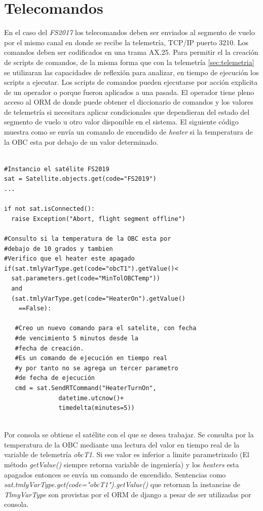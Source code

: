 \documentclass[twoside,twocolumn]{article}
\begin{document}
\section{Telecomandos}
\label{sec:telecomandos}

En el caso del \textit{FS2017} los telecomandos deben ser enviados al segmento de vuelo por el mismo canal en donde se recibe la telemetría, TCP/IP puerto 3210. Los comandos deben ser codificados en una trama AX.25. 
Para permitir el la creación de scripts de comandos, de la misma forma que con 
la telemetría \ref{sec:telemetria} se utilizaran las capacidades de reflexión 
para analizar, en tiempo de ejecución los scripts a ejecutar. Los scripts de 
comandos pueden ejecutarse por acción explicita de un operador o porque fueron 
aplicados a una pasada. 
El operador tiene pleno acceso al ORM de donde puede obtener el diccionario de comandos y los valores de telemetría si necesitara aplicar condicionales que dependieran del estado del segmento de vuelo u otro valor disponible en el sistema. El siguiente código muestra como se envía un comando de encendido de \textit{heater} si la temperatura de la OBC esta por debajo de un valor determinado.

\begin{verbatim}

#Instancio el satélite FS2019
sat = Satellite.objects.get(code="FS2019")
...

if not sat.isConnected():
  raise Exception("Abort, flight segment offline")

#Consulto si la temperatura de la OBC esta por 
#debajo de 10 grados y tambien
#Verifico que el heater este apagado
if(sat.tmlyVarType.get(code="obcT1").getValue()<
  sat.parameters.get(code="MinTolOBCTemp"))
  and 
  (sat.tmlyVarType.get(code="HeaterOn").getValue()
    ==False):
   
   #Creo un nuevo comando para el satelite, con fecha 
   #de vencimiento 5 minutos desde la 
   #fecha de creación. 
   #Es un comando de ejecución en tiempo real 
   #y por tanto no se agrega un tercer parametro 
   #de fecha de ejecución
   cmd = sat.SendRTCommand("HeaterTurnOn", 
			   datetime.utcnow()+
			   timedelta(minutes=5))
   
\end{verbatim}

Por consola se obtiene el satélite con el que se desea trabajar. Se consulta por la temperatura de la OBC mediante una lectura del valor en tiempo real de la variable de telemetría \textit{obcT1}. Si ese valor es inferior a limite parametrizado (El método  \textit{getValue()} siempre retorna variable de ingeniería) y los \textit{heaters} esta apagados entonces se envía un comando de encendido.
Sentencias como \textit{sat.tmlyVarType.get(code="obcT1").getValue()} que retornan la instancias de \textit{TlmyVarType} son provistas por el ORM de django a pesar de ser utilizadas por consola. 
\end{document}
